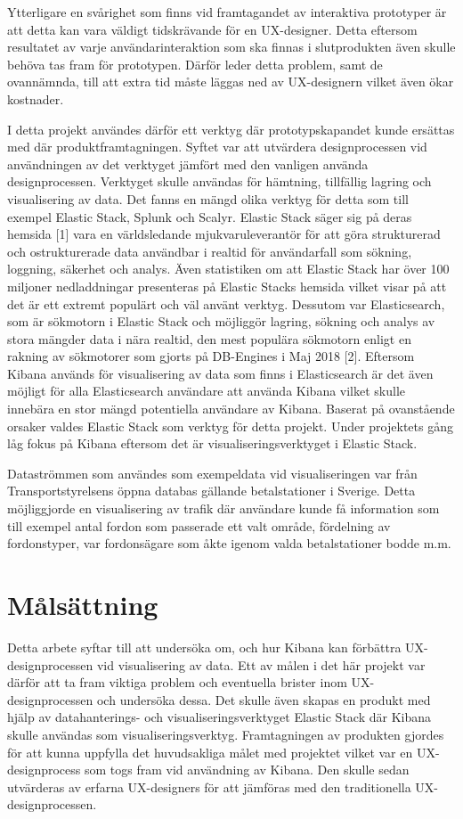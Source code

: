 \documentclass[12pt]{kththesis}
\begin{document}
Ytterligare en svårighet som finns vid framtagandet av interaktiva prototyper är att detta kan vara väldigt tidskrävande för en UX-designer. Detta eftersom resultatet av varje användarinteraktion som ska finnas i slutprodukten även skulle behöva tas fram för prototypen. Därför leder detta problem, samt de ovannämnda, till att extra tid måste läggas ned av UX-designern vilket även ökar kostnader. 

I detta projekt användes därför ett verktyg där prototypskapandet kunde ersättas med där produktframtagningen. Syftet var att utvärdera designprocessen vid användningen av det verktyget jämfört med den vanligen använda designprocessen. Verktyget skulle användas för hämtning, tillfällig lagring och visualisering av data. Det fanns en mängd olika verktyg för detta som till exempel Elastic Stack, Splunk och Scalyr. Elastic Stack säger sig på deras hemsida [1] vara en världsledande mjukvaruleverantör för att göra strukturerad och ostrukturerade data användbar i realtid för användarfall som sökning, loggning, säkerhet och analys. Även statistiken om att Elastic Stack har över 100 miljoner nedladdningar presenteras på Elastic Stacks hemsida vilket visar på att det är ett extremt populärt och väl använt verktyg. Dessutom var Elasticsearch, som är sökmotorn i Elastic Stack och möjliggör lagring, sökning och analys av stora mängder data i nära realtid, den mest populära sökmotorn enligt en rakning av sökmotorer som gjorts på DB-Engines i Maj 2018 [2]. Eftersom Kibana används för visualisering av data som finns i Elasticsearch är det även möjligt för alla Elasticsearch användare att använda Kibana vilket skulle innebära en stor mängd potentiella användare av Kibana. Baserat på ovanstående orsaker valdes Elastic Stack som verktyg för detta projekt. Under projektets gång låg fokus på Kibana eftersom det är visualiseringsverktyget i Elastic Stack.

Dataströmmen som användes som exempeldata vid visualiseringen var från Transportstyrelsens öppna databas gällande betalstationer i Sverige. Detta möjliggjorde en visualisering av trafik där användare kunde få information som till exempel antal fordon som passerade ett valt område, fördelning av fordonstyper, var fordonsägare som åkte igenom valda betalstationer bodde m.m.

\section{Målsättning}
Detta arbete syftar till att undersöka om, och hur Kibana kan förbättra UX-designprocessen vid visualisering av data. Ett av målen i det här projekt var därför att ta fram viktiga problem och eventuella brister inom UX-designprocessen och undersöka dessa. Det skulle även skapas en produkt med hjälp av datahanterings- och visualiseringsverktyget Elastic Stack där Kibana skulle användas som visualiseringsverktyg. Framtagningen av produkten gjordes för att kunna uppfylla det huvudsakliga målet med projektet vilket var en UX-designprocess som togs fram vid användning av Kibana. Den skulle sedan utvärderas av erfarna UX-designers för att jämföras med den traditionella UX-designprocessen. 
\end{document}
